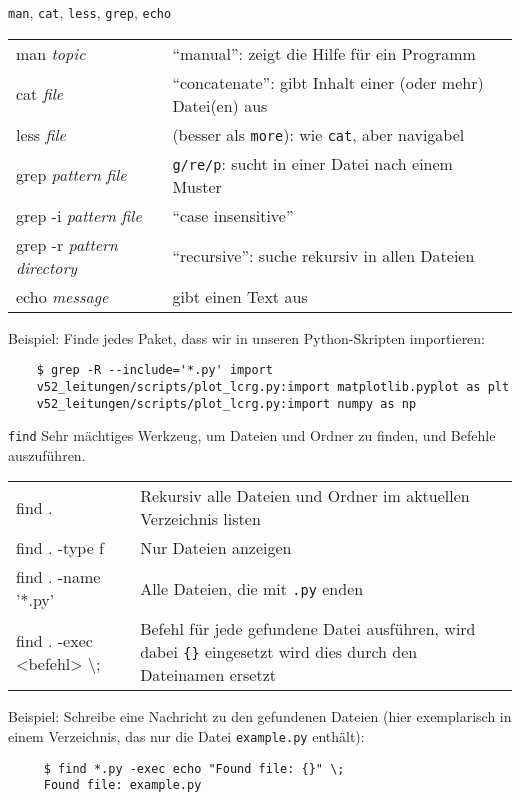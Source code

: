 \begin{frame}[fragile]{\texttt{man}, \texttt{cat}, \texttt{less}, \texttt{grep}, \texttt{echo}}
  \begin{tabu}{>{\ttfamily}l X[,L]}
    man \textit{topic}    & \enquote{manual}: zeigt die Hilfe für ein Programm \\
    cat \textit{file}                           & \enquote{concatenate}: gibt Inhalt einer (oder mehr) Datei(en) aus \\
    less \textit{file}                          & (besser als \texttt{more}): wie \texttt{cat}, aber navigabel \\
    grep \textit{pattern} \textit{file}         & \texttt{g/re/p}: sucht in einer Datei nach einem Muster \\
    grep -i \textit{pattern} \textit{file}      & \enquote{case insensitive} \\
    grep -r \textit{pattern} \textit{directory} & \enquote{recursive}: suche rekursiv in allen Dateien \\
    echo \textit{message}                       & gibt einen Text aus
  \end{tabu}

  Beispiel: Finde jedes Paket, dass wir in unseren Python-Skripten importieren:

  \begin{verbatim}
    $ grep -R --include='*.py' import
    v52_leitungen/scripts/plot_lcrg.py:import matplotlib.pyplot as plt
    v52_leitungen/scripts/plot_lcrg.py:import numpy as np
  \end{verbatim}

\end{frame}

\begin{frame}[fragile]{\texttt{find}}
  Sehr mächtiges Werkzeug, um Dateien und Ordner zu finden, und Befehle auszuführen.

  \begin{tabu}{>{\ttfamily}l X[,L]}
    find . & Rekursiv alle Dateien und Ordner im aktuellen Verzeichnis listen \\
    find . -type f & Nur Dateien anzeigen \\
    find . -name '*.py' & Alle Dateien, die mit \texttt{.py} enden \\
    find . -exec <befehl> \textbackslash{}; & Befehl für jede gefundene Datei ausführen, wird dabei \texttt{\{\}} eingesetzt wird dies durch den Dateinamen ersetzt \\
  \end{tabu}
  Beispiel: Schreibe eine Nachricht zu den gefundenen Dateien (hier exemplarisch in einem Verzeichnis, das nur die Datei \texttt{example.py} enthält):
  \begin{verbatim}
     $ find *.py -exec echo "Found file: {}" \;
     Found file: example.py
  \end{verbatim}
\end{frame}

